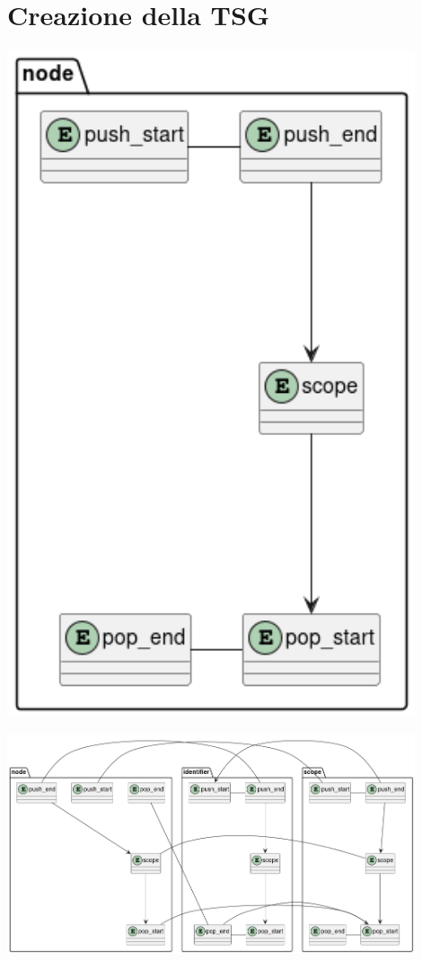 \chapter{Creazione della TSG}

\begin{center}
    \includegraphics[width=12cm]{chapters/identifier.png}
\end{center}
\begin{center}
    \includegraphics[width=12cm]{chapters/scoped_identifier_1.png}
\end{center}
